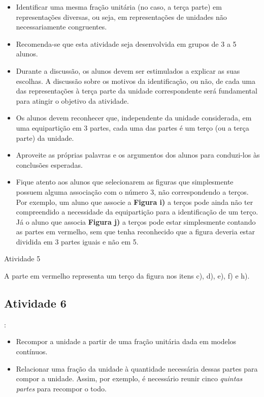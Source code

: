 \begin{itemize} %
    \item       Identificar uma mesma fração unitária (no caso, a terça parte) em representações diversas, ou seja, em representações de unidades não necessariamente congruentes.
\end{itemize} %

 \vspace{.1cm}

   \vspace{.1cm}
\begin{itemize} %
    \item       Recomenda-se que esta atividade seja desenvolvida em grupos de 3 a 5 alunos.
    \item       Durante a discussão, os alunos devem ser estimulados a explicar as suas escolhas. A discussão sobre os motivos da identificação, ou não, de cada uma das representações à terça parte da unidade correspondente será fundamental para atingir o objetivo da atividade.
    \item       Os alunos devem reconhecer que, independente da unidade considerada, em uma equipartição em 3 partes, cada uma das partes é um terço (ou a terça parte) da unidade.
    \item       Aproveite as próprias palavras e os argumentos dos alunos para conduzi-los às conclusões esperadas.
    \item       Fique atento aos alunos que selecionarem as figuras que simplesmente possuem alguma associação com o número 3, não correspondendo a terços. Por exemplo, um aluno que associe a       {\bf Figura i)} a terços pode ainda não ter compreendido a necessidade da equipartição para a identificação de um terço. Já o aluno que associa       {\bf Figura j)}       a terços pode estar simplesmente contando as partes em vermelho, sem que tenha reconhecido que a figura deveria estar dividida em 3 partes iguais e não em 5.
\end{itemize} %

\begin{resposta*}{Atividade 5}

A parte em vermelho representa um terço da figura nos itens c), d), e), f) e h).
\end{resposta*}

\pagebreak

\subsection{Atividade 6}
  \vspace{.1cm}:
\begin{itemize} %
    \item       Recompor a unidade a partir de uma fração unitária dada em modelos contínuos.
    \item       Relacionar uma fração da unidade à quantidade necessária dessas partes para compor a unidade. Assim, por exemplo, é necessário reunir cinco       {\it quintas partes}       para recompor o todo.
\end{itemize} %


